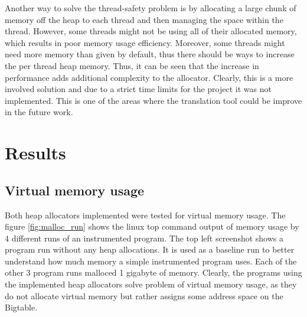 \documentclass[bsc,frontabs,twoside,singlespacing,parskip,deptreport]{infthesis}     %
\begin{document}
Another way to solve the thread-safety problem is by allocating a large chunk of memory off the heap to each thread and then managing the space within the thread. However, some threads might not be using all of their allocated memory, which results in poor memory usage efficiency. Moreover, some threads might need more memory than given by default, thus there should be ways to increase the per thread heap memory. Thus, it can be seen that the increase in performance adds additional complexity to the allocator. Clearly, this is a more involved solution and due to a strict time limits for the project it was not implemented. This is one of the areas where the translation tool could be improve in the future work.

\section{Results}

\subsection{Virtual memory usage}

Both heap allocators implemented were tested for virtual memory usage. The figure \ref{fig:malloc_run} shows the linux top command output of memory usage by 4 different runs of an instrumented program. The top left screenshot shows a program run without any heap allocations. It is used as a baseline run to better understand how much memory a simple instrumented program uses. Each of the other 3 program runs malloced 1 gigabyte of memory. Clearly, the programs using the implemented heap allocators solve problem of virtual memory usage, as they do not allocate virtual memory but rather assigns some address space on the Bigtable.
\end{document}
